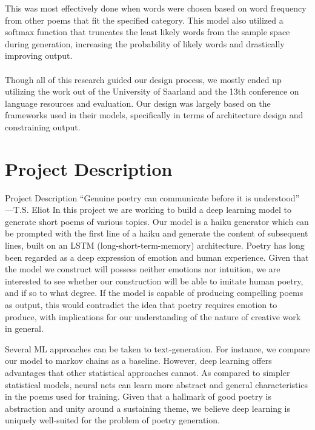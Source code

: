 \documentclass{article} %
\begin{document}
This was most effectively done when words were chosen based on word frequency from other poems that fit the specified category. 
This model also utilized a softmax function that truncates the least likely words from the sample space during generation, increasing the probability of likely words and drastically improving output.\\\\
Though all of this research guided our design process, we mostly ended up utilizing the work out of the University of Saarland and the 13th conference on language resources and evaluation. Our design was largely based on the frameworks used in their models, specifically in terms of architecture design and constraining output.

\section{Project Description}

Project Description
“Genuine poetry can communicate before it is understood” —T.S. Eliot
In this project we are working to build a deep learning model to generate short poems of various topics.
Our model is a haiku generator which can be prompted with the first line of a haiku and generate the content of subsequent lines, built on an LSTM (long-short-term-memory) architecture.
Poetry has long been regarded as a deep expression of emotion and human experience. Given that the model we construct will possess neither emotions nor intuition, we are interested to see whether our construction will be able to imitate human poetry, and if so to what degree. If the model is capable of producing compelling poems as output, this would contradict the idea that poetry requires emotion to produce, with implications for our understanding of the nature of creative work in general.


Several ML approaches can be taken to text-generation.
For instance, we compare our model to markov chains as a baseline.
However, deep learning offers advantages that other statistical approaches cannot.
As compared to simpler statistical models, neural nets can learn more abstract and general characteristics in the poems used for training.
Given that a hallmark of good poetry is abstraction and unity around a sustaining theme,
we believe deep learning is uniquely well-suited for the problem of poetry generation.
\end{document}
